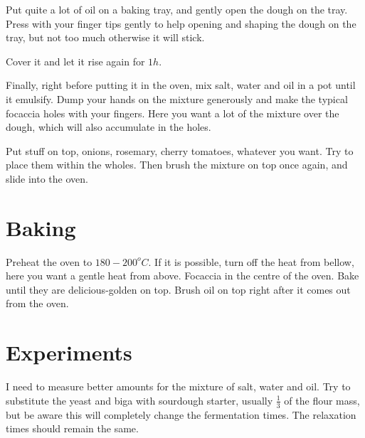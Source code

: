 
Put quite a lot of oil on a baking tray, and gently open the dough on the tray.
%
Press with your finger tips gently to help opening and shaping the dough on the tray, but not too much otherwise it will stick.

Cover it and let it rise again for $1h$.

Finally, right before putting it in the oven, mix salt, water and oil in a pot until it emulsify.
%
Dump your hands on the mixture generously and make the typical focaccia holes with your fingers. Here you want a lot of the mixture over the dough, which will also accumulate in the holes.

Put stuff on top, onions, rosemary, cherry tomatoes, whatever you want. Try to place them within the wholes. 
%
Then brush the mixture on top once again, and slide into the oven.

\section{Baking}

Preheat the oven to $180-200^oC$. If it is possible, turn off the heat from bellow, here you want a gentle heat from above.
% 
Focaccia in the centre of the oven.
%
Bake until they are delicious-golden on top.
%
Brush oil on top right after it comes out from the oven.

\section{Experiments}

I need to measure better amounts for the mixture of salt, water and oil.
%
Try to substitute the yeast and biga with sourdough starter, usually $\frac{1}{3}$ of the flour mass, but be aware this will completely change the fermentation times. The relaxation times should remain the same.


